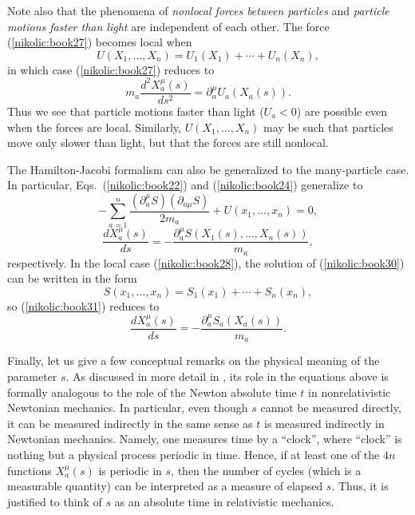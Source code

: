 \documentclass[12pt,twoside]{report} %
\begin{document}
Note also that the phenomena of {\em nonlocal forces
between particles} and {\em particle motions faster than light} are independent of each other.
The force (\ref{nikolic:book27}) becomes local when
\begin{equation}\label{nikolic:book28}
 U(X_1,\ldots,X_n)=U_1(X_1)+ \cdots + U_n(X_n) ,
\end{equation}
in which case (\ref{nikolic:book27}) reduces to
\begin{equation}\label{nikolic:book29}
 m_a\frac{d^2X_a^{\mu}(s)}{ds^2}=\partial_a^{\mu}U_a(X_a(s)) .
\end{equation}
Thus we see that particle motions faster than light ($U_a<0$)
are possible even when the forces are local.
Similarly, $U(X_1,\ldots,X_n)$ may be such that particles move only slower than light,
but that the forces are still nonlocal. 

The Hamilton-Jacobi formalism can also be generalized to the many-particle case.
In particular, Eqs.~(\ref{nikolic:book22}) and (\ref{nikolic:book24}) generalize to
\begin{equation}\label{nikolic:book30}
 -\sum_{a=1}^n \frac{(\partial_a^{\mu}S) (\partial_{a\mu}S)}{2m_a}
+U(x_1,\ldots, x_n) =0 ,
\end{equation}
\begin{equation}\label{nikolic:book31}
 \frac{dX_a^{\mu}(s)}{ds}=-\frac{\partial_a^{\mu}S(X_1(s),\ldots, X_n(s))}{m_a} ,
\end{equation}
respectively.
In the local case (\ref{nikolic:book28}), the solution of (\ref{nikolic:book30}) can be written in the form
\begin{equation}\label{nikolic:book32}
 S(x_1,\ldots ,x_n)=S_1(x_1)+ \cdots + S_n(x_n) ,
\end{equation}
so (\ref{nikolic:book31}) reduces to
\begin{equation}\label{nikolic:book33}
 \frac{dX_a^{\mu}(s)}{ds}=-\frac{\partial_a^{\mu}S_a(X_a(s))}{m_a} .
\end{equation}






Finally, let us give a few conceptual remarks on the physical meaning of the parameter $s$.
As discussed in more detail in \cite{nikscalpot}, its role in the equations above is 
formally analogous to the role of the Newton absolute time $t$ in nonrelativistic 
Newtonian mechanics. In particular, even though $s$ cannot be measured directly,
it can be measured indirectly in the same sense as $t$ is measured indirectly in Newtonian mechanics.
Namely, one measures time by a ``clock'', where ``clock'' is nothing but a physical process 
periodic in time. Hence, if at least one of the $4n$ functions
$X_a^{\mu}(s)$ is periodic in $s$, then the number of cycles
(which is a measurable quantity) can be interpreted as a measure of elapsed $s$.
Thus, it is justified to think of $s$ as an absolute time in relativistic mechanics.
\end{document}
